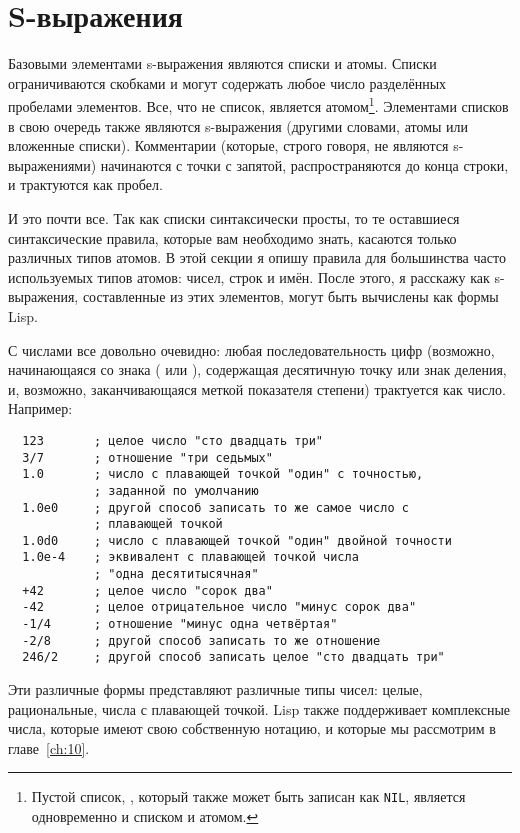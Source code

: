 \section{S-выражения}

Базовыми элементами s-выражения являются списки и атомы. Списки ограничиваются скобками и
могут содержать любое число разделённых пробелами элементов. Все, что не список, является
атомом\footnote{Пустой список, \code{()}, который также может быть записан как
  \lstinline{NIL}, является одновременно и списком и атомом.}. Элементами списков в свою
очередь также являются s-выражения (другими словами, атомы или вложенные
списки). Комментарии (которые, строго говоря, не являются s-выражениями) начинаются с
точки с запятой, распространяются до конца строки, и трактуются как пробел.

И это почти все. Так как списки синтаксически просты, то те оставшиеся синтаксические
правила, которые вам необходимо знать, касаются только различных типов атомов. В этой
секции я опишу правила для большинства часто используемых типов атомов: чисел, строк и
имён. После этого, я расскажу как s-выражения, составленные из этих элементов, могут быть
вычислены как формы Lisp.

С числами все довольно очевидно: любая последовательность цифр (возможно, начинающаяся со
знака (\code{+} или \code{-}), содержащая десятичную точку или знак деления, и, возможно,
заканчивающаяся меткой показателя степени) трактуется как число. Например:

\begin{lstlisting}
  123       ; целое число "сто двадцать три"
  3/7       ; отношение "три седьмых"
  1.0       ; число с плавающей точкой "один" с точностью, 
            ; заданной по умолчанию
  1.0e0     ; другой способ записать то же самое число с
            ; плавающей точкой
  1.0d0     ; число с плавающей точкой "один" двойной точности
  1.0e-4    ; эквивалент с плавающей точкой числа
            ; "одна десятитысячная"
  +42       ; целое число "сорок два"
  -42       ; целое отрицательное число "минус сорок два"
  -1/4      ; отношение "минус одна четвёртая"
  -2/8      ; другой способ записать то же отношение
  246/2     ; другой способ записать целое "сто двадцать три"
\end{lstlisting}

Эти различные формы представляют различные типы чисел: целые, рациональные, числа с
плавающей точкой. Lisp также поддерживает комплексные числа, которые имеют свою
собственную нотацию, и которые мы рассмотрим в главе~\ref{ch:10}.


